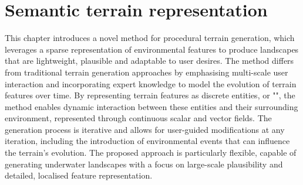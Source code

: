 \graphicspath{ {./Chapter 2/figures/} {./Chapter 2/figures/Snake/} {./Chapter 2/figures/Water/} {./Chapter 2/results/} }

\chapter{Semantic terrain representation}
\label{chap:semantic-representation}

\abstract
\label{chap:env-obj-abstract}
This chapter introduces a novel method for procedural terrain generation, which leverages a sparse representation of environmental features to produce landscapes that are lightweight, plausible and adaptable to user desires. The method differs from traditional terrain generation approaches by emphasising multi-scale user interaction and incorporating expert knowledge to model the evolution of terrain features over time. By representing terrain features as discrete entities, or "", the method enables dynamic interaction between these entities and their surrounding environment, represented through continuous scalar and vector fields. The generation process is iterative and allows for user-guided modifications at any iteration, including the introduction of environmental events that can influence the terrain's evolution. The proposed approach is particularly flexible, capable of generating underwater landscapes with a focus on large-scale plausibility and detailed, localised feature representation.
\pagebreak

\minitoc


